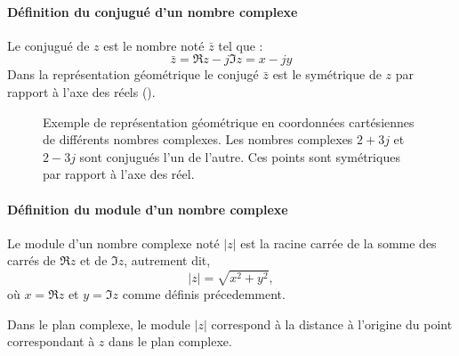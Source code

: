 \paragraph{Définition du conjugué d'un nombre complexe}
Le conjugué de $z$ est le nombre noté $\bar{z}$ tel que :
\[
\bar{z}=\Re{z}-j\Im{z}=x-jy
\]
Dans la représentation géométrique le conjugé $\bar{z}$ est le symétrique 
de $z$ par rapport à l'axe des réels ().
\begin{figure}[!h]
    \centering
    
    \caption{Exemple de représentation géométrique en coordonnées cartésiennes 
             de différents nombres complexes. Les nombres complexes $2+3j$ et 
             $2-3j$ sont conjugués l'un de l'autre. Ces points sont symétriques
             par rapport à l'axe des réel.
             \label{fig-plan_complexe}}
\end{figure}
\paragraph{Définition du module d'un nombre complexe}
Le module d'un nombre complexe noté $|z|$ est la 
racine carrée de la somme des carrés de $\Re{z}$ et de $\Im{z}$, 
autrement dit, 
\[
|z|=\sqrt{x^2+y^2},
\]
où $x=\Re{z}$ et $y=\Im{z}$ comme définis précedemment.

Dans le plan complexe, le module $|z|$ correspond à la distance à l'origine du 
point correspondant à $z$ dans le plan complexe.

